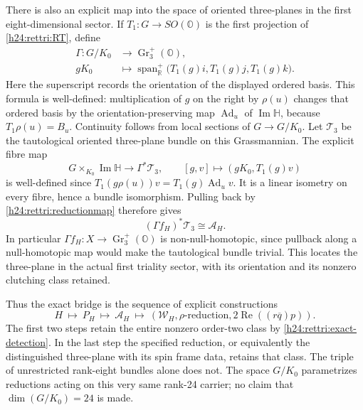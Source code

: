 There is also an explicit map into the space of oriented
three-planes in the first eight-dimensional sector. If
$T_1:G\to SO(\mathbb O)$ is the first projection of
\eqref{h24:rettri:RT}, define
\begin{equation}
 \begin{aligned}
 \Gamma:G/K_0&\longrightarrow\operatorname{Gr}_3^+(\mathbb O),\\
 gK_0&\longmapsto
 \operatorname{span}_{\mathbb R}^{+}
       \bigl(T_1(g)i,T_1(g)j,T_1(g)k\bigr).
 \end{aligned}
 \label{h24:rettri:Grassmann}
\end{equation}
Here the superscript records the orientation of the displayed
ordered basis. This formula is well-defined: multiplication of
$g$ on the right by $\rho(u)$ changes that ordered basis by
the orientation-preserving map $\operatorname{Ad}_u$ of
$\operatorname{Im}\mathbb H$, because $T_1\rho(u)=B_u$.
Continuity follows from local sections of $G\to G/K_0$.
Let $\mathcal T_3$ be the tautological oriented three-plane
bundle on this Grassmannian. The explicit fibre map
\[
 G\times_{K_0}\operatorname{Im}\mathbb H
       \longrightarrow\Gamma^*\mathcal T_3,\qquad
 [g,v]\longmapsto(gK_0,T_1(g)v)
\]
is well-defined since
$T_1(g\rho(u))v=T_1(g)\operatorname{Ad}_u v$.
It is a linear isometry on every fibre, hence a bundle
isomorphism. Pulling back by \eqref{h24:rettri:reductionmap}
therefore gives
\[
 (\Gamma f_H)^*\mathcal T_3\cong\mathcal A_H.
\]
In particular $\Gamma f_H:X\to\operatorname{Gr}_3^+(\mathbb O)$
is non-null-homotopic, since pullback along a null-homotopic
map would make the tautological bundle trivial. This locates
the three-plane in the actual first triality sector, with its
orientation and its nonzero clutching class retained.

Thus the exact bridge is the sequence of explicit constructions
\[
 H\ \longmapsto\ P_H\ \longmapsto\ \mathcal A_H
 \ \longmapsto\ (\mathcal W_H,\rho\text{-reduction},
                   2\operatorname{Re}((r\overline q)p)).
\]
The first two steps retain the entire nonzero order-two class
by \eqref{h24:rettri:exact-detection}. In the last step the
specified reduction, or equivalently the distinguished
three-plane with its spin frame data, retains that class.
The triple of unrestricted rank-eight bundles alone does not.
The space $G/K_0$ parametrizes reductions acting on this very
same rank-24 carrier; no claim that $\dim(G/K_0)=24$ is made.

